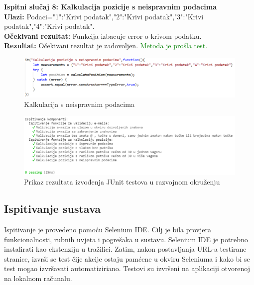 {			\noindent \textbf {Ispitni slučaj 8: Kalkulacija pozicije s neispravnim podacima}\\
			\noindent \textbf {Ulazi:} Podaci={"1":"Krivi podatak","2":"Krivi podatak","3":"Krivi podatak","4":"Krivi podatak"}.\\
			\noindent \textbf {Očekivani rezultat:} Funkcija izbacuje error o krivom podatku.\\
			\noindent \textbf {Rezultat:} Očekivani rezultat je zadovoljen. \textcolor{green}{Metoda je prošla test.}\\

				\begin{figure}[H]
					\centering
					\includegraphics[width=1\linewidth]{"slike/kalkulacijaSNeispravnimPodacima.png"}
					\caption{Kalkulacija s neispravnim podacima}
					\label{fig:neisp-kal}
				\end{figure}


				\begin{figure}[H]
					\centering
					\includegraphics[width=1\linewidth]{"slike/rezultati.png"}
					\caption{Prikaz rezultata izvođenja JUnit testova u razvojnom okruženju}
					\label{fig:rez}
				\end{figure}
			
			\eject
			\subsection{Ispitivanje sustava}
			
			{Ispitivanje je provedeno pomoću Selenium IDE. Cilj je bila provjera funkcionalnosti, rubnih uvjeta i pogrešaka u sustavu. Selenium IDE je potrebno instalirati kao ekstenziju u tražilici. Zatim, nakon postavljanja URL-a testirane stranice, izvrši se test čije akcije ostaju pamćene u okviru Seleniuma i kako bi se test mogao izvršavati automatiziriano. Testovi su izvršeni na aplikaciji otvorenoj na lokalnom računalu. \hfill\break


}}

